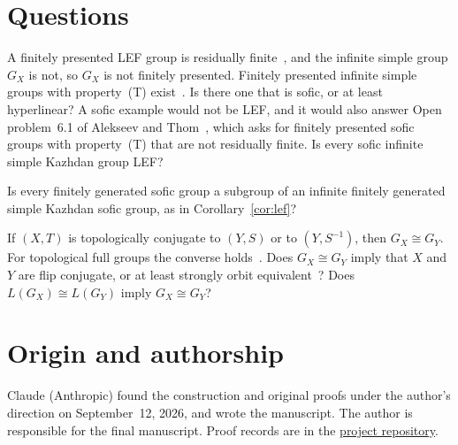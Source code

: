 \documentclass[11pt]{amsart}
\begin{document}
\section{Questions}

A finitely presented LEF group is residually
finite~\cite{Stepin,VershikGordon}, and the infinite simple group $G_X$ is
not, so $G_X$ is not finitely presented. Finitely presented infinite
simple groups with property~\textup{(T)} exist~\cite{CapraceRemy}. Is
there one that is sofic, or at least hyperlinear? A sofic example would
not be LEF, and it would also answer Open problem~6.1 of Alekseev and
Thom~\cite{AlekseevThom}, which asks for finitely presented sofic groups
with property~\textup{(T)} that are not residually finite. Is every
sofic infinite simple Kazhdan group LEF?

Is every finitely generated sofic group a subgroup of an infinite finitely
generated simple Kazhdan sofic group, as in Corollary~\ref{cor:lef}?

If $(X,T)$ is topologically conjugate to $(Y,S)$ or to $(Y,S^{-1})$, then
$G_X\cong G_Y$. For topological full groups the converse
holds~\cite{GPS99,BezuglyiMedynets}. Does $G_X\cong G_Y$ imply that $X$
and $Y$ are flip conjugate, or at least strongly orbit
equivalent~\cite{GPS}? Does $L(G_X)\cong L(G_Y)$ imply $G_X\cong G_Y$?

\section*{Origin and authorship}
Claude (Anthropic) found the construction and original proofs under
the author's direction on September~12, 2026, and wrote the manuscript.
The author is responsible for the final manuscript. Proof records are
in the \href{https://github.com/SauersML/group-approximation}{project repository}.
\end{document}
